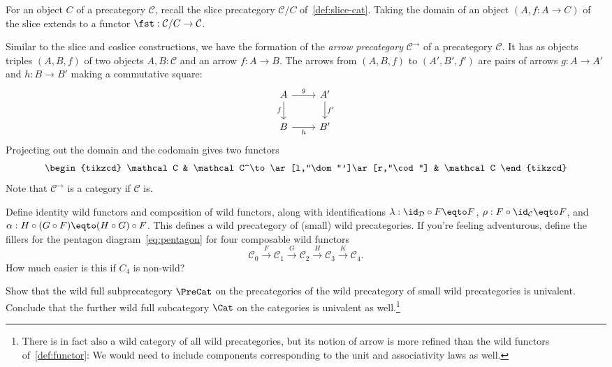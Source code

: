 \begin{example}\label{ex:slice-projection}
  For an object $C$ of a precategory $\mathcal C$,
  recall the slice precategory
  $\mathcal C/C$ of~\cref{def:slice-cat}.
  Taking the domain of an object $(A,f:A\to C)$ of the slice
  extends to a functor $\fst : \mathcal C/C \to \mathcal C$.
\end{example}
\begin{example}\label{ex:arrow-cat}
  Similar to the slice and coslice constructions,
  we have the formation of the \emph{arrow precategory} $\mathcal C^\to$
  of a precategory $\mathcal C$.
  It has as objects triples $(A,B,f)$ of two objects $A,B:\mathcal C$
  and an arrow $f: A\to B$.
  The arrows from $(A,B,f)$ to $(A',B',f')$ are pairs of arrows
  $g : A \to A'$ and $h : B\to B'$ making a commutative square:
  \[
    \begin{tikzcd}
      A \ar[d,"f"']\ar[r,"g"] & A'\ar[d,"f'"] \\
      B \ar[r,"h"'] & B'
    \end{tikzcd}
  \]
  Projecting out the domain and the codomain gives
  two functors
  \[
    \begin{tikzcd}
      \mathcal C & \mathcal C^\to \ar[l,"\dom"']\ar[r,"\cod"] & \mathcal C
    \end{tikzcd}
  \]
  Note that $\mathcal C^\to$ is a category if $\mathcal C$ is.
\end{example}
\begin{xca}\label{xca:wildprecat-of-wildprecats}
  Define identity wild functors and composition of wild functors,
  along with identifications $\lambda : \id_{\mathcal D}\circ F \eqto F$,
  $\rho : F \circ \id_{\mathcal C} \eqto F$,
  and $\alpha : H\circ (G \circ F) \eqto (H \circ G)\circ F$.
  This defines a wild precategory of (small) wild precategories.
  If you're feeling adventurous, define the fillers for the pentagon diagram~\eqref{eq:pentagon}
  for four composable wild functors
  \[
    \mathcal C_0 \xrightarrow F
    \mathcal C_1 \xrightarrow G
    \mathcal C_2 \xrightarrow H
    \mathcal C_3 \xrightarrow K
    \mathcal C_4.
  \]
  How much easier is this if $C_4$ is non-wild?
\end{xca}
\begin{xca}\label{xca:wildcat-of-precats}
  Show that the wild full subprecategory $\PreCat$ on the precategories of the
  wild precategory of small wild precategories is univalent.
  Conclude that the further wild full subcategory $\Cat$ on the categories
  is univalent as well.\footnote{%
    There is in fact also a wild category of all wild precategories,
    but its notion of arrow is more refined
    than the wild functors of~\cref{def:functor}:
    We would need to include components corresponding to
    the unit and associativity laws as well.}
\end{xca}

